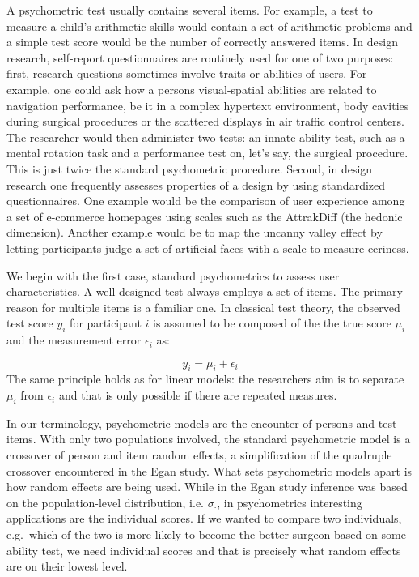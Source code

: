 \documentclass[]{svmono}
\begin{document}
A psychometric test usually contains several items. For example, a test
to measure a child's arithmetic skills would contain a set of arithmetic
problems and a simple test score would be the number of correctly
answered items. In design research, self-report questionnaires are
routinely used for one of two purposes: first, research questions
sometimes involve traits or abilities of users. For example, one could
ask how a persons visual-spatial abilities are related to navigation
performance, be it in a complex hypertext environment, body cavities
during surgical procedures or the scattered displays in air traffic
control centers. The researcher would then administer two tests: an
innate ability test, such as a mental rotation task and a performance
test on, let's say, the surgical procedure. This is just twice the
standard psychometric procedure. Second, in design research one
frequently assesses properties of a design by using standardized
questionnaires. One example would be the comparison of user experience
among a set of e-commerce homepages using scales such as the AttrakDiff
(the hedonic dimension). Another example would be to map the uncanny
valley effect by letting participants judge a set of artificial faces
with a scale to measure eeriness.

We begin with the first case, standard psychometrics to assess user
characteristics. A well designed test always employs a set of items. The
primary reason for multiple items is a familiar one. In classical test
theory, the observed test score \(y_i\) for participant \(i\) is assumed
to be composed of the the true score \(\mu_i\) and the measurement error
\(\epsilon_i\) as:

\[y_i = \mu_i + \epsilon_i\] The same principle holds as for linear
models: the researchers aim is to separate \(\mu_i\) from \(\epsilon_i\)
and that is only possible if there are repeated measures.

In our terminology, psychometric models are the encounter of persons and
test items. With only two populations involved, the standard
psychometric model is a crossover of person and item random effects, a
simplification of the quadruple crossover encountered in the Egan study.
What sets psychometric models apart is how random effects are being
used. While in the Egan study inference was based on the
population-level distribution, i.e. \(\sigma_\cdot\), in psychometrics
interesting applications are the individual scores. If we wanted to
compare two individuals, e.g.~which of the two is more likely to become
the better surgeon based on some ability test, we need individual scores
and that is precisely what random effects are on their lowest level.
\end{document}

